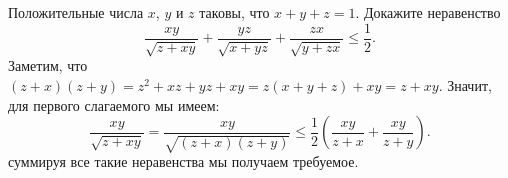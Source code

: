 \problem{}
Положительные числа $x$, $y$ и $z$ таковы, что $x + y + z = 1$.
Докажите неравенство
\[
    \frac{x y}{\sqrt{z + x y}}
    +
    \frac{y z}{\sqrt{x + y z}}
    +
    \frac{z x}{\sqrt{y + z x}}
\leq
    \frac{1}{2}
.\]
\solution
Заметим, что
$(z + x) (z + y) = z^2 + x z + y z + x y = z (x + y + z) + x y = z + x y$.
Значит, для первого слагаемого мы имеем:
\[
    \frac{xy}{\sqrt{z+xy}} = \frac{xy}{\sqrt{(z+x)(z+y)}}
\leq
    \frac{1}{2}(\frac{xy}{z+x}+\frac{xy}{z+y}).
\]
суммируя все такие неравенства мы получаем требуемое.
\endproblem
